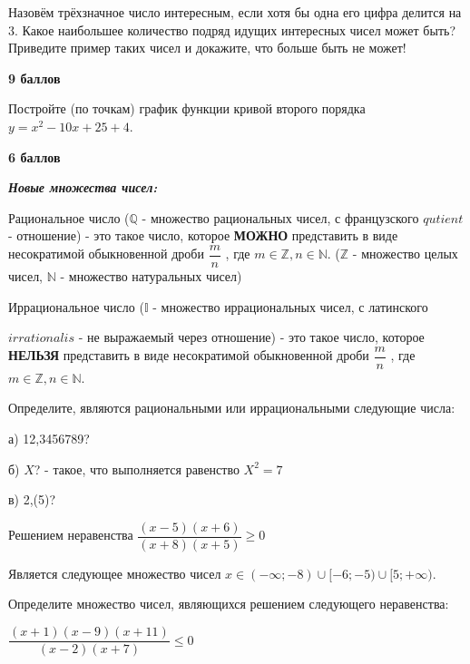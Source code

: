  Назовём трёхзначное число интересным, если хотя бы одна его
цифра делится на 3. Какое наибольшее количество подряд идущих интересных чисел может
быть? Приведите пример таких чисел и докажите, что больше быть не может!

\begin{flushright} \textbf{9 баллов}\\ 
\end{flushright}


 Постройте (по точкам) график функции кривой второго порядка $y=x^2-10x+25+4$.
\begin{flushright} \textbf{6 баллов}\\ 
\end{flushright}

\newpage

\hspace{1mm}

 \textbf{\textit{Новые множества чисел:}}

Рациональное число ($\mathbb{Q}$ - множество рациональных чисел, с французского 
$qutient$ - отношение) - это такое число, которое \textbf{МОЖНО} представить в виде несократимой обыкновенной дроби $\dfrac{m}{n}$ , где $m\in \mathbb{Z}, n\in \mathbb{N}$. ($\mathbb{Z}$ - множество целых чисел, $\mathbb{N}$ - множество натуральных чисел)

Иррациональное число ($\mathbb{I}$ - множество иррациональных чисел, с латинского 

$irrationalis$ - не выражаемый через отношение) - это такое число, которое \textbf{НЕЛЬЗЯ} представить в виде несократимой обыкновенной дроби $\dfrac{m}{n}$ , где $m\in \mathbb{Z}, n\in \mathbb{N}$.

Определите, являются рациональными или иррациональными следующие числа:

а) 12,3456789?

б) $X$? - такое, что выполняется равенство $X^2=7$

в) 2,(5)?

 Решением неравенства $\dfrac{\left(x-5\right)\left(x+6\right)}{\left(x+8\right)\left(x+5\right)}\ge0$ 

Является следующее множество чисел $x\in(-\infty;-8) \cup[-6;-5)\cup[5;+\infty)$.

Определите множество чисел, являющихся решением следующего неравенства:

$\dfrac{\left(x+1\right)\left(x-9\right)\left(x+11\right)}{\left(x-2\right)\left(x+7\right)}\le0$

